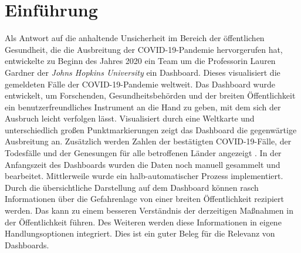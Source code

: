 \chapter{Einführung}
Als Antwort auf die anhaltende Unsicherheit im Bereich der öffentlichen Gesundheit, die die Ausbreitung der COVID-19-Pandemie hervorgerufen hat, 
entwickelte zu Beginn des Jahres 2020 ein Team um die Professorin Lauren Gardner der \textit{Johns Hopkins University} ein Dashboard. 
Dieses visualisiert die gemeldeten Fälle der COVID-19-Pandemie weltweit. Das Dashboard wurde entwickelt, um Forschenden, Gesundheitsbehörden und der breiten Öffentlichkeit 
ein benutzerfreundliches Instrument an die Hand zu geben, mit dem sich der Ausbruch leicht verfolgen lässt.
Visualisiert durch eine Weltkarte und unterschiedlich großen Punktmarkierungen zeigt das Dashboard die gegenwärtige Ausbreitung an.
Zusätzlich werden Zahlen der bestätigten COVID-19-Fälle, der Todesfälle und der Genesungen für alle betroffenen Länder angezeigt \cite[Vgl.][533]{dong_interactive_2020}.
In der Anfangszeit des Dashboards wurden die Daten noch manuell gesammelt und bearbeitet. Mittlerweile wurde ein halb-automatischer Prozess implementiert.
Durch die übersichtliche Darstellung auf dem Dashboard können rasch Informationen über die Gefahrenlage von einer breiten Öffentlichkeit
rezipiert werden. Das kann zu einem besseren Verständnis der derzeitigen Maßnahmen in der Öffentlichkeit führen. Des Weiteren werden diese Informationen
in eigene Handlungsoptionen integriert. Dies ist ein guter Beleg für die Relevanz von Dashboards.



